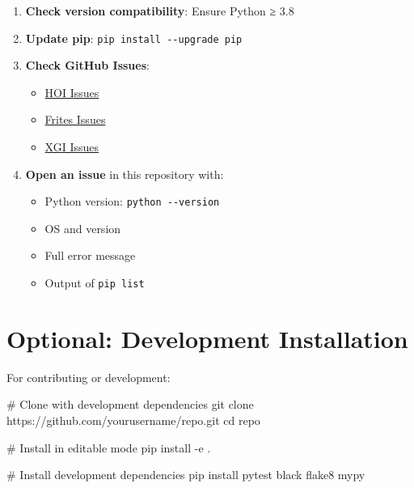 \documentclass[
  11pt,
  letterpaper,
  oneside,
  openany]{book}
\newenvironment{Shaded}{\begin{snugshade}}{\end{snugshade}}
\newcommand{\AttributeTok}[1]{\textcolor[rgb]{0.40,0.45,0.13}{#1}}
\newcommand{\BuiltInTok}[1]{\textcolor[rgb]{0.00,0.23,0.31}{#1}}
\newcommand{\CommentTok}[1]{\textcolor[rgb]{0.37,0.37,0.37}{#1}}
\newcommand{\ExtensionTok}[1]{\textcolor[rgb]{0.00,0.23,0.31}{#1}}
\newcommand{\FunctionTok}[1]{\textcolor[rgb]{0.28,0.35,0.67}{#1}}
\newcommand{\NormalTok}[1]{\textcolor[rgb]{0.00,0.23,0.31}{#1}}
\providecommand{\tightlist}{%
  \setlength{\itemsep}{0pt}\setlength{\parskip}{0pt}}
\begin{document}
\begin{enumerate}
\def\labelenumi{\arabic{enumi}.}
\tightlist
\item
  \textbf{Check version compatibility}: Ensure Python ≥ 3.8
\item
  \textbf{Update pip}: \texttt{pip\ install\ -\/-upgrade\ pip}
\item
  \textbf{Check GitHub Issues}:

  \begin{itemize}
  \tightlist
  \item
    \href{https://github.com/brainets/hoi/issues}{HOI Issues}
  \item
    \href{https://github.com/brainets/frites/issues}{Frites Issues}
  \item
    \href{https://github.com/xgi-org/xgi/issues}{XGI Issues}
  \end{itemize}
\item
  \textbf{Open an issue} in this repository with:

  \begin{itemize}
  \tightlist
  \item
    Python version: \texttt{python\ -\/-version}
  \item
    OS and version
  \item
    Full error message
  \item
    Output of \texttt{pip\ list}
  \end{itemize}
\end{enumerate}

\section*{Optional: Development
Installation}\label{optional-development-installation}


For contributing or development:

\begin{Shaded}
\begin{Highlighting}[]
\CommentTok{\# Clone with development dependencies}
\FunctionTok{git}\NormalTok{ clone https://github.com/yourusername/repo.git}
\BuiltInTok{cd}\NormalTok{ repo}

\CommentTok{\# Install in editable mode}
\ExtensionTok{pip}\NormalTok{ install }\AttributeTok{{-}e}\NormalTok{ .}

\CommentTok{\# Install development dependencies}
\ExtensionTok{pip}\NormalTok{ install pytest black flake8 mypy}
\end{Highlighting}
\end{Shaded}
\end{document}
